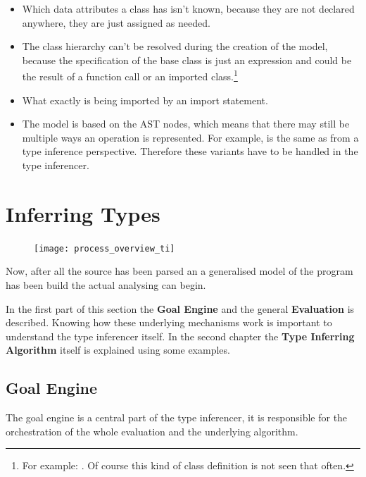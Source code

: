 \documentclass[12pt,halfparskip,DIV11,BCOR10mm]{scrreprt}
\begin{document}
\begin{itemize}
	\item Which data attributes a class has isn't known, because they are not declared anywhere, they are just assigned as needed.
	\item The class hierarchy can't be resolved during the creation of the model, because the specification of the base class is just an expression and could be the result of a function call or an imported class.\footnote{
	For example: . Of course this kind of class definition is not seen that often.}
	\item What exactly is being imported by an import statement.
	\item The model is based on the AST nodes, which means that there may still be multiple ways an operation is represented. For example,  is the same as  from a type inference perspective. Therefore these variants have to be handled in the type inferencer.
\end{itemize}


\section{Inferring Types}

\begin{figure}
	\vspace{-0.6cm}
	\texttt{[image: process\_overview\_ti]}
\end{figure}

Now, after all the source has been parsed an a generalised model of the program has been build the actual analysing can begin. 

In the first part of this section the \textbf{Goal Engine} and the general \textbf{Evaluation} is described. Knowing how these underlying mechanisms work is important to understand the type inferencer itself. In the second chapter the \textbf{Type Inferring Algorithm} itself is explained using some examples. 

\subsection{Goal Engine}

The goal engine is a central part of the type inferencer, it is responsible for the orchestration of the whole evaluation and the underlying algorithm.
\end{document}

